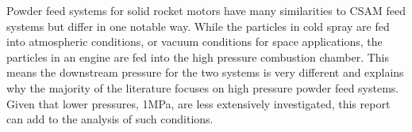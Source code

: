 Powder feed systems for solid rocket motors have many similarities to CSAM feed systems but differ in one notable way. While the particles in cold spray are fed into atmospheric conditions, or vacuum conditions for space applications, the particles in an engine are fed into the high pressure combustion chamber. This means the downstream pressure for the two systems is very different and explains why the majority of the literature focuses on high pressure powder feed systems. Given that lower pressures, \>1MPa, are less extensively investigated, this report can add to the analysis of such conditions.


